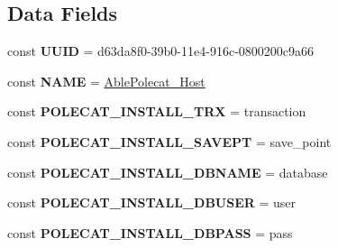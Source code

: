 \subsection*{Data Fields}
\begin{DoxyCompactItemize}
\item 
\hypertarget{class_able_polecat___host_a74b892c8c0b86bf9d04c5819898c51e7}{}const {\bfseries U\+U\+I\+D} = \textquotesingle{}d63da8f0-\/39b0-\/11e4-\/916c-\/0800200c9a66\textquotesingle{}\label{class_able_polecat___host_a74b892c8c0b86bf9d04c5819898c51e7}

\item 
\hypertarget{class_able_polecat___host_a244352f035b82b20b0efa506167fd862}{}const {\bfseries N\+A\+M\+E} = \textquotesingle{}\hyperlink{class_able_polecat___host}{Able\+Polecat\+\_\+\+Host}\textquotesingle{}\label{class_able_polecat___host_a244352f035b82b20b0efa506167fd862}

\item 
\hypertarget{class_able_polecat___host_a1ea92768c364c8a9e60420c722fd176e}{}const {\bfseries P\+O\+L\+E\+C\+A\+T\+\_\+\+I\+N\+S\+T\+A\+L\+L\+\_\+\+T\+R\+X} = \textquotesingle{}transaction\textquotesingle{}\label{class_able_polecat___host_a1ea92768c364c8a9e60420c722fd176e}

\item 
\hypertarget{class_able_polecat___host_a78eb8d014cbcb282d82a615727f08424}{}const {\bfseries P\+O\+L\+E\+C\+A\+T\+\_\+\+I\+N\+S\+T\+A\+L\+L\+\_\+\+S\+A\+V\+E\+P\+T} = \textquotesingle{}save\+\_\+point\textquotesingle{}\label{class_able_polecat___host_a78eb8d014cbcb282d82a615727f08424}

\item 
\hypertarget{class_able_polecat___host_af17616201c7a2d8f3f0bfdee033f04c6}{}const {\bfseries P\+O\+L\+E\+C\+A\+T\+\_\+\+I\+N\+S\+T\+A\+L\+L\+\_\+\+D\+B\+N\+A\+M\+E} = \textquotesingle{}database\textquotesingle{}\label{class_able_polecat___host_af17616201c7a2d8f3f0bfdee033f04c6}

\item 
\hypertarget{class_able_polecat___host_a05badf1eed959ed2c5e7c9432e16e8bf}{}const {\bfseries P\+O\+L\+E\+C\+A\+T\+\_\+\+I\+N\+S\+T\+A\+L\+L\+\_\+\+D\+B\+U\+S\+E\+R} = \textquotesingle{}user\textquotesingle{}\label{class_able_polecat___host_a05badf1eed959ed2c5e7c9432e16e8bf}

\item 
\hypertarget{class_able_polecat___host_ad4d142eb3f28159722f3cc6c6848732b}{}const {\bfseries P\+O\+L\+E\+C\+A\+T\+\_\+\+I\+N\+S\+T\+A\+L\+L\+\_\+\+D\+B\+P\+A\+S\+S} = \textquotesingle{}pass\textquotesingle{}\label{class_able_polecat___host_ad4d142eb3f28159722f3cc6c6848732b}

\end{DoxyCompactItemize}
